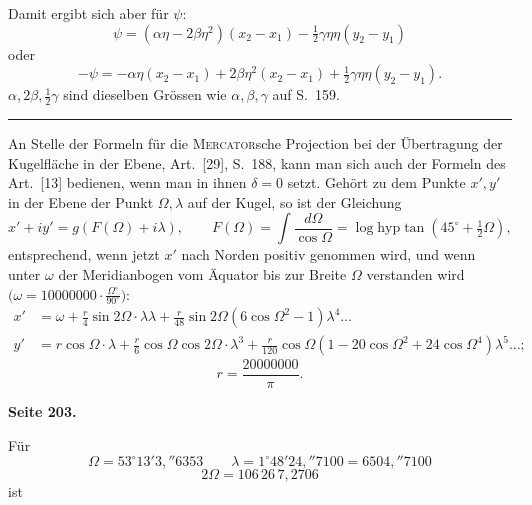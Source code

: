 \documentclass[12pt,a4paper]{article}
\newcommand{\tang}{\tan}
\theoremstyle{plain}
\theoremstyle{definition}
\theoremstyle{remark}
\begin{document}
Damit ergibt sich aber für $\psi$:
\[
\psi = (\alpha \eta - 2\beta \eta^2)(x_2 - x_1) - \tfrac{1}{2}\gamma \eta\eta (y_2 - y_1)
\]
oder
\begin{equation}
-\psi = -\alpha \eta (x_2 - x_1) + 2\beta \eta^2 (x_2 - x_1) + \tfrac{1}{2}\gamma \eta\eta (y_2 - y_1).
\end{equation}
$\alpha, 2\beta, \tfrac{1}{2}\gamma$ sind dieselben Grössen wie $\alpha, \beta, \gamma$ auf S.~159.

\medskip
\hrule
\medskip

An Stelle der Formeln für die \textsc{Mercator}sche Projection bei der Übertragung der Kugelfläche in der Ebene, Art.~[29], S.~188, kann man sich auch der Formeln des Art.~[13] bedienen, wenn man in ihnen $\delta = 0$ setzt. Gehört zu dem Punkte $x', y'$ in der Ebene der Punkt $\Omega, \lambda$ auf der Kugel, so ist der Gleichung
\[
x' + iy' = g(F(\Omega) + i\lambda), \qquad F(\Omega) = \int \frac{d\Omega}{\cos \Omega} = \log \mathrm{hyp} \tang(45^{\circ} + \tfrac{1}{2}\Omega),
\]
entsprechend, wenn jetzt $x'$ nach Norden positiv genommen wird, und wenn unter $\omega$ der Meridianbogen vom Äquator bis zur Breite $\Omega$ verstanden wird $\bigl(\omega = 10000000 \cdot \frac{\Omega^{\circ}}{90^{\circ}}\bigr)$:
\begin{align*}
x' &= \omega + \frac{r}{4} \sin 2\Omega \cdot \lambda\lambda + \frac{r}{48} \sin 2\Omega (6\cos \Omega^2 - 1) \lambda^4 \ldots \\
y' &= r \cos \Omega \cdot \lambda + \frac{r}{6} \cos \Omega \cos 2\Omega \cdot \lambda^3 + \frac{r}{120} \cos \Omega (1 - 20\cos \Omega^2 + 24\cos \Omega^4) \lambda^5 \ldots;
\end{align*}
\[
r = \frac{20000000}{\pi}.
\]

\newpage
\textbf{Seite 203.}

Für
\[
\Omega = 53^{\circ} 13' 3{,}''6353 \qquad \lambda = 1^{\circ} 48' 24{,}''7100 = 6504{,}''7100
\]
\[
2\Omega = 106\, 26\, 7{,}2706
\]
ist
\end{document}
